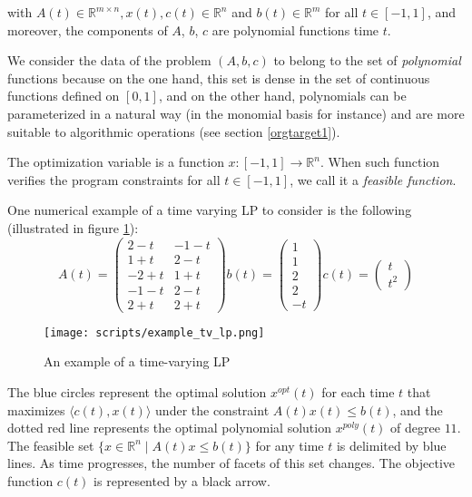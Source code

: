 \documentclass[moor]{informs1}
\begin{document}
\noindent  with \(A(t) \in \mathbb R^{m \times n}, x(t), c(t) \in \mathbb R^n\) and \(b(t) \in \mathbb R^m\) for all \(t \in [-1, 1]\), and moreover, the components of \(A\), \(b\), \(c\) are polynomial functions time \(t\).

We consider the data of the problem \((A, b, c)\) to belong to the set of \emph{polynomial} functions because on the one hand, this set is dense in the set of continuous functions defined on \([0, 1]\), and on the other hand, polynomials can be parameterized in a natural way (in the monomial basis for instance) and are more suitable to algorithmic operations (see section \ref{orgtarget1}). 

The optimization variable is a function \(x: [-1, 1]\rightarrow \mathbb R^n\). When such function verifies the program constraints for all \(t \in [-1,1]\), we call it a \emph{feasible function}. 

  One numerical example of a time varying LP to consider is the following (illustrated in figure \ref{fig:orgparagraph1}):
\[
A(t) = \begin{pmatrix}
2-t&-1-t\\
1+t&2-t\\
-2+t&1+t\\
-1-t&2-t\\
2+t&2+t
\end{pmatrix}
b(t) = \begin{pmatrix}1\\1\\2\\2\\-t\end{pmatrix}
c(t) = \begin{pmatrix}t \\ t^2\end{pmatrix} \]

\begin{figure}[htb]
\centering
\texttt{[image: scripts/example\_tv\_lp.png]}
\caption{\label{fig:orgparagraph1}
An example of a time-varying LP}
\end{figure}


The blue circles represent the optimal solution \(x^{opt}(t)\) for each time \(t\) that maximizes \(\langle c(t), x(t)\rangle\) under the constraint \(A(t)x(t) \le b(t)\), and the dotted red line represents the optimal polynomial solution \(x^{poly}(t)\) of degree \(11\). The feasible set \(\{x \in \mathbb R^n\; |\;  A(t)x \le b(t)\}\) for any time \(t\) is delimited by blue lines. As time progresses, the number of facets of this set changes. The objective function \(c(t)\) is represented by a black arrow. 
\end{document}
